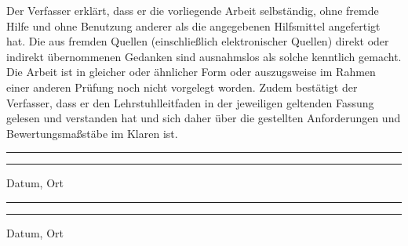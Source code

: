 Der Verfasser erklärt, dass er die vorliegende Arbeit selbständig, ohne fremde Hilfe und ohne Benutzung anderer als die angegebenen Hilfsmittel angefertigt hat. Die aus fremden Quellen (einschließlich elektronischer Quellen) direkt oder indirekt übernommenen Gedanken sind ausnahmslos als solche kenntlich gemacht. Die Arbeit ist in gleicher oder ähnlicher Form oder auszugsweise im Rahmen einer anderen Prüfung noch nicht vorgelegt worden. Zudem bestätigt der Verfasser, dass er den Lehrstuhlleitfaden in der jeweiligen geltenden Fassung gelesen und verstanden hat und sich daher über die gestellten Anforderungen und Bewertungsmaßstäbe im Klaren ist. \\[4cm]
\noindent\rule{5cm}{.4pt}\hfill\rule{5cm}{.4pt}\par
\noindent Datum, Ort \hfill \autor \\

\noindent\rule{5cm}{.4pt}\hfill\rule{5cm}{.4pt}\par
\noindent Datum, Ort \hfill \autor \\
